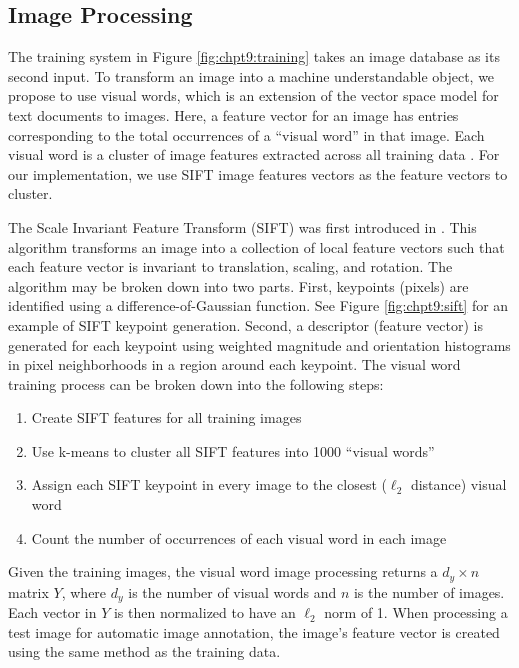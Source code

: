 \subsection{Image Processing}

The training system in Figure \ref{fig:chpt9:training} takes an image database as its second
input. To transform an image into a machine understandable object, we propose to use
visual words, which is an extension of the vector space model for text documents to
images. Here, a feature vector for an image has entries corresponding to the total
occurrences of a ``visual word'' in that image. Each visual word is a cluster of image
features extracted across all training data \cite{yang2007evaluating}. For our
implementation, we use SIFT image features vectors as the feature vectors to cluster.

The Scale Invariant Feature Transform (SIFT) was first introduced in
\cite{lowe1999object}. This algorithm transforms an image into a collection of local
feature vectors such that each feature vector is invariant to translation, scaling, and
rotation. The algorithm may be broken down into two parts. First, keypoints (pixels) are
identified using a difference-of-Gaussian function. See Figure \ref{fig:chpt9:sift} for an
example of SIFT keypoint generation. Second, a descriptor (feature vector)
is generated for each keypoint using weighted magnitude and orientation histograms in pixel
neighborhoods in a region around each keypoint. The visual word training process can be broken down into the following steps:
\begin{enumerate}
\item Create SIFT features for all training images
\item Use k-means to cluster all SIFT features into 1000 ``visual words''
\item Assign each SIFT keypoint in every image to the closest ($\ell_2$ distance) visual word
\item Count the number of occurrences of each visual word in each image
\end{enumerate}

Given the training images, the visual word image processing returns a $d_y\times n$ matrix $Y$,
where $d_y$ is the number of visual words and $n$ is the number of images. Each vector
in $Y$ is then normalized to have an $\ell_2$ norm of 1. When processing a test image for
automatic image annotation, the image's feature vector is created using the same method as
the training data.

